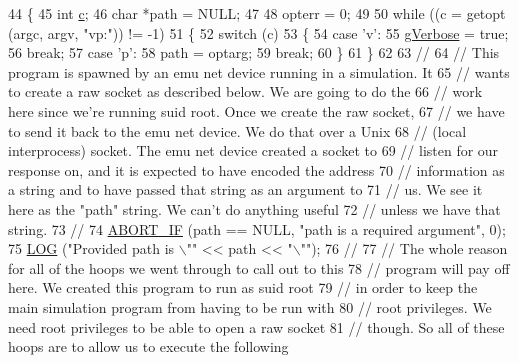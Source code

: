 \begin{DoxyCode}
44 \{
45   \textcolor{keywordtype}{int} \hyperlink{lte_2model_2fading-traces_2fading__trace__generator_8m_ae0323a9039add2978bf5b49550572c7c}{c};
46   \textcolor{keywordtype}{char} *path = NULL;
47 
48   opterr = 0;
49 
50   \textcolor{keywordflow}{while} ((c = getopt (argc, argv, \textcolor{stringliteral}{"vp:"})) != -1)
51     \{
52       \textcolor{keywordflow}{switch} (c)
53         \{
54         \textcolor{keywordflow}{case} \textcolor{charliteral}{'v'}:
55           \hyperlink{tap-creator_8cc_a80b7a0563409f3e21c80e0459c85845e}{gVerbose} = \textcolor{keyword}{true};
56           \textcolor{keywordflow}{break};
57         \textcolor{keywordflow}{case} \textcolor{charliteral}{'p'}:
58           path = optarg;
59           \textcolor{keywordflow}{break};
60         \}
61     \}
62 
63   \textcolor{comment}{//}
64   \textcolor{comment}{// This program is spawned by an emu net device running in a simulation.  It}
65   \textcolor{comment}{// wants to create a raw socket as described below.  We are going to do the}
66   \textcolor{comment}{// work here since we're running suid root.  Once we create the raw socket,}
67   \textcolor{comment}{// we have to send it back to the emu net device.  We do that over a Unix}
68   \textcolor{comment}{// (local interprocess) socket.  The emu net device created a socket to}
69   \textcolor{comment}{// listen for our response on, and it is expected to have encoded the address}
70   \textcolor{comment}{// information as a string and to have passed that string as an argument to}
71   \textcolor{comment}{// us.  We see it here as the "path" string.  We can't do anything useful}
72   \textcolor{comment}{// unless we have that string.}
73   \textcolor{comment}{//}
74   \hyperlink{creator-utils_8h_a91c11c90ad2f1672fbd3c031038dce16}{ABORT\_IF} (path == NULL, \textcolor{stringliteral}{"path is a required argument"}, 0);
75   \hyperlink{creator-utils_8h_a158a8c64f24645c7478298399825737f}{LOG} (\textcolor{stringliteral}{"Provided path is \(\backslash\)""} << path << \textcolor{stringliteral}{"\(\backslash\)""});
76   \textcolor{comment}{//}
77   \textcolor{comment}{// The whole reason for all of the hoops we went through to call out to this}
78   \textcolor{comment}{// program will pay off here.  We created this program to run as suid root}
79   \textcolor{comment}{// in order to keep the main simulation program from having to be run with}
80   \textcolor{comment}{// root privileges.  We need root privileges to be able to open a raw socket}
81   \textcolor{comment}{// though.  So all of these hoops are to allow us to execute the following}

\end{DoxyCode}

